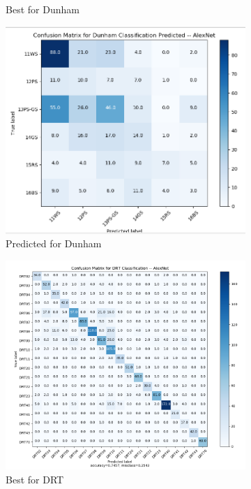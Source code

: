 \begin{figure}
\begin{subfigure}{.5\textwidth}
  \caption{Best for Dunham}
  \label{fig:alcm_dunham}
\end{subfigure}%
\begin{subfigure}{.5\textwidth}
  \centering
  \includegraphics[width=.8\linewidth]{figures/04-al_dunham_predicted.PNG}
  \caption{Predicted for Dunham}
  \label{fig:alcmpred_dunham}
\end{subfigure}
\begin{subfigure}{.5\textwidth}
  \centering
  \includegraphics[width=.8\linewidth]{figures/04-al_drt_best.PNG}
  \caption{Best for DRT}
  \label{fig:alcm_drt}
\end{subfigure}%
\begin{subfigure}{.5\textwidth}
  \centering

\end{subfigure}
\end{figure}

